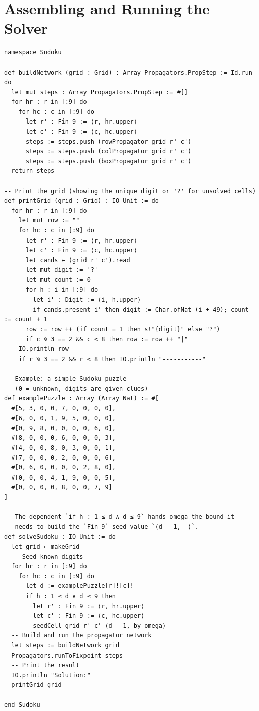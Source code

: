 \documentclass[12pt, a4paper, openright]{book}
\theoremstyle{thmstyle}
\theoremstyle{defstyle}
\begin{document}
\section{Assembling and Running the Solver}

\begin{verbatim}
namespace Sudoku

def buildNetwork (grid : Grid) : Array Propagators.PropStep := Id.run do
  let mut steps : Array Propagators.PropStep := #[]
  for hr : r in [:9] do
    for hc : c in [:9] do
      let r' : Fin 9 := ⟨r, hr.upper⟩
      let c' : Fin 9 := ⟨c, hc.upper⟩
      steps := steps.push (rowPropagator grid r' c')
      steps := steps.push (colPropagator grid r' c')
      steps := steps.push (boxPropagator grid r' c')
  return steps

-- Print the grid (showing the unique digit or '?' for unsolved cells)
def printGrid (grid : Grid) : IO Unit := do
  for hr : r in [:9] do
    let mut row := ""
    for hc : c in [:9] do
      let r' : Fin 9 := ⟨r, hr.upper⟩
      let c' : Fin 9 := ⟨c, hc.upper⟩
      let cands ← (grid r' c').read
      let mut digit := '?'
      let mut count := 0
      for h : i in [:9] do
        let i' : Digit := ⟨i, h.upper⟩
        if cands.present i' then digit := Char.ofNat (i + 49); count := count + 1
      row := row ++ (if count = 1 then s!"{digit}" else "?")
      if c % 3 == 2 && c < 8 then row := row ++ "|"
    IO.println row
    if r % 3 == 2 && r < 8 then IO.println "-----------"

-- Example: a simple Sudoku puzzle
-- (0 = unknown, digits are given clues)
def examplePuzzle : Array (Array Nat) := #[
  #[5, 3, 0, 0, 7, 0, 0, 0, 0],
  #[6, 0, 0, 1, 9, 5, 0, 0, 0],
  #[0, 9, 8, 0, 0, 0, 0, 6, 0],
  #[8, 0, 0, 0, 6, 0, 0, 0, 3],
  #[4, 0, 0, 8, 0, 3, 0, 0, 1],
  #[7, 0, 0, 0, 2, 0, 0, 0, 6],
  #[0, 6, 0, 0, 0, 0, 2, 8, 0],
  #[0, 0, 0, 4, 1, 9, 0, 0, 5],
  #[0, 0, 0, 0, 8, 0, 0, 7, 9]
]

-- The dependent `if h : 1 ≤ d ∧ d ≤ 9` hands omega the bound it
-- needs to build the `Fin 9` seed value `⟨d - 1, _⟩`.
def solveSudoku : IO Unit := do
  let grid ← makeGrid
  -- Seed known digits
  for hr : r in [:9] do
    for hc : c in [:9] do
      let d := examplePuzzle[r]![c]!
      if h : 1 ≤ d ∧ d ≤ 9 then
        let r' : Fin 9 := ⟨r, hr.upper⟩
        let c' : Fin 9 := ⟨c, hc.upper⟩
        seedCell grid r' c' ⟨d - 1, by omega⟩
  -- Build and run the propagator network
  let steps := buildNetwork grid
  Propagators.runToFixpoint steps
  -- Print the result
  IO.println "Solution:"
  printGrid grid

end Sudoku
\end{verbatim}
\end{document}
